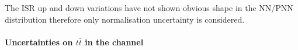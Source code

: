 


  

The ISR up and down variations have not shown obvious shape in the NN/PNN distribution 
therefore only normalisation uncertainty is considered. 





\paragraph{Uncertainties on $t\bar{t}$ in the \hadhad
  channel}\mbox{}\\

